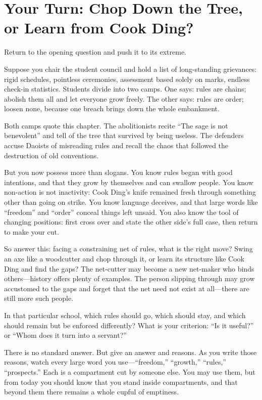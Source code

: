 \section[Your Turn: Axe or Cook Ding's Knife?]{Your Turn: Chop Down the Tree, or Learn from Cook Ding?}
Return to the opening question and push it to its extreme.

Suppose you chair the student council and hold a list of long-standing grievances: rigid schedules, pointless ceremonies, assessment based solely on marks, endless check-in statistics. Students divide into two camps. One says: rules are chains; abolish them all and let everyone grow freely. The other says: rules are order; loosen none, because one breach brings down the whole embankment.

Both camps quote this chapter. The abolitionists recite ``The sage is not benevolent'' and tell of the tree that survived by being useless. The defenders accuse Daoists of misreading rules and recall the chaos that followed the destruction of old conventions.

But you now possess more than slogans. You know rules began with good intentions, and that they grow by themselves and can swallow people. You know non-action is not inactivity: Cook Ding's knife remained fresh through something other than going on strike. You know language deceives, and that large words like ``freedom'' and ``order'' conceal things left unsaid. You also know the tool of changing positions: first cross over and state the other side's full case, then return to make your cut.

So answer this: facing a constraining net of rules, what is the right move? Swing an axe like a woodcutter and chop through it, or learn its structure like Cook Ding and find the gaps? The net-cutter may become a new net-maker who binds others---history offers plenty of examples. The person slipping through may grow accustomed to the gaps and forget that the net need not exist at all---there are still more such people.

In that particular school, which rules should go, which should stay, and which should remain but be enforced differently? What is your criterion: ``Is it useful?'' or ``Whom does it turn into a servant?''

There is no standard answer. But give an answer and reasons. As you write those reasons, watch every large word you use---``freedom,'' ``growth,'' ``rules,'' ``prospects.'' Each is a compartment cut by someone else. You may use them, but from today you should know that you stand inside compartments, and that beyond them there remains a whole cupful of emptiness.
